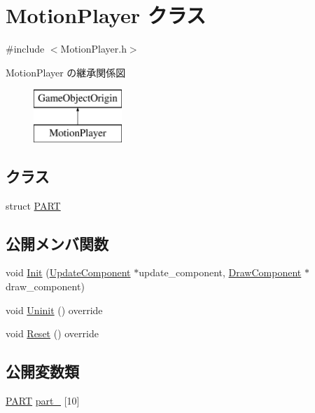 \hypertarget{class_motion_player}{}\section{Motion\+Player クラス}
\label{class_motion_player}


{\ttfamily \#include $<$Motion\+Player.\+h$>$}

Motion\+Player の継承関係図\begin{figure}[H]
\begin{center}
\leavevmode
\includegraphics[height=2.000000cm]{class_motion_player}
\end{center}
\end{figure}
\subsection*{クラス}
\begin{DoxyCompactItemize}
\item 
struct \mbox{\hyperlink{struct_motion_player_1_1_p_a_r_t}{P\+A\+RT}}
\end{DoxyCompactItemize}
\subsection*{公開メンバ関数}
\begin{DoxyCompactItemize}
\item 
void \mbox{\hyperlink{class_motion_player_ad49f85cbd150d7fffc35068c502e7e85}{Init}} (\mbox{\hyperlink{class_update_component}{Update\+Component}} $\ast$update\+\_\+component, \mbox{\hyperlink{class_draw_component}{Draw\+Component}} $\ast$draw\+\_\+component)
\item 
void \mbox{\hyperlink{class_motion_player_aaef70673468175ad4a96c944cd90199c}{Uninit}} () override
\item 
void \mbox{\hyperlink{class_motion_player_a326a495d5b68cea9caa99980cac919bd}{Reset}} () override
\end{DoxyCompactItemize}
\subsection*{公開変数類}
\begin{DoxyCompactItemize}
\item 
\mbox{\hyperlink{struct_motion_player_1_1_p_a_r_t}{P\+A\+RT}} \mbox{\hyperlink{class_motion_player_a8d402bc6caa1ef15a549313ab0d6aa66}{part\+\_\+}} \mbox{[}10\mbox{]}
\end{DoxyCompactItemize}
